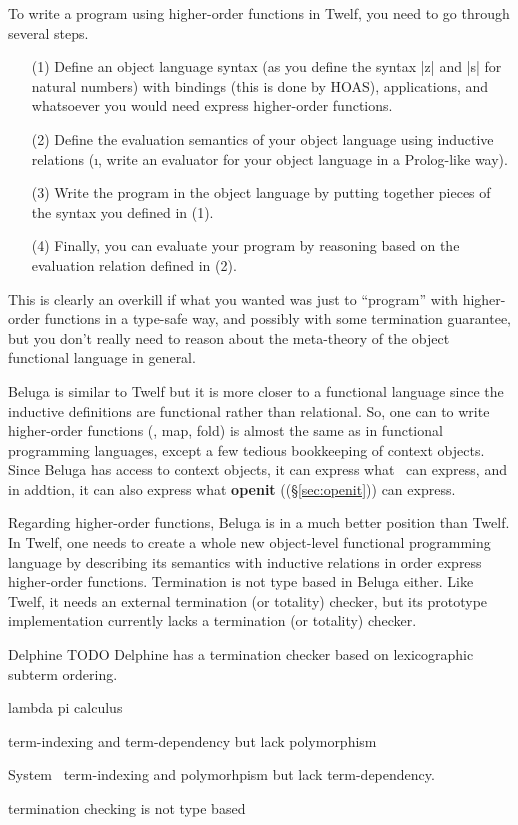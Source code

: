 To write a program using higher-order functions in Twelf,
you need to go through several steps.
\begin{itemize}
\item[(1)] Define an object language syntax
(as you define the syntax |z| and |s| for natural numbers)
with bindings (this is done by HOAS), applications, and
whatsoever you would need express higher-order functions.
\item[(2)] Define the evaluation semantics of your object language using
        inductive relations (\i, write an evaluator for
        your object language in a Prolog-like way).
\item[(3)] Write the program in the object language by putting
        together pieces of the syntax you defined in (1).
\item[(4)] Finally, you can evaluate your program by reasoning based on
        the evaluation relation defined in (2).
\end{itemize}
This is clearly an overkill if what you wanted was just to ``program''
with higher-order functions in a type-safe way, and possibly with some
termination guarantee, but you don't really need to reason about
the meta-theory of the object functional language in general.

Beluga \cite{Pie10} is similar to Twelf but it is more closer to
a functional language since the inductive definitions are functional
rather than relational. So, one can to write higher-order functions
(\eg, map, fold) is almost the same as in functional programming languages,
except a few tedious bookkeeping of context objects. Since Beluga has access
to context objects, it can express what \MsfIt\ can express, and in addtion,
it can also express what \textbf{openit} ((\S\ref{sec:openit})) can express.

Regarding higher-order functions, Beluga is in a much better position
than Twelf. In Twelf, one needs to create a whole new object-level
functional programming language by describing its semantics with
inductive relations in order express higher-order functions.
Termination is not type based in Beluga either. Like Twelf, it needs
an external termination (or totality) checker, but its prototype
implementation currently lacks a termination (or totality) checker.

Delphine \cite{pos08phd} TODO
Delphine has a termination checker based on lexicographic subterm ordering.

lambda pi calculus

term-indexing and term-dependency 
but lack polymorphism

System \Fi\
term-indexing and polymorhpism
but lack term-dependency.


termination checking is not type based


